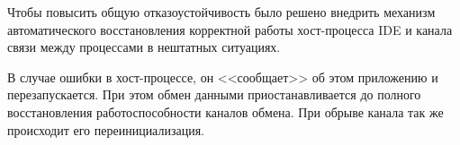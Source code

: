 Чтобы повысить общую отказоустойчивость было решено внедрить механизм автоматического восстановления корректной работы хост-процесса IDE и канала связи между процессами в нештатных ситуациях.

В случае ошибки в хост-процессе, он <<сообщает>> об этом приложению и перезапускается. При этом обмен данными приостанавливается до полного восстановления работоспособности каналов обмена. При обрыве канала так же происходит его переинициализация.

\pagebreak
